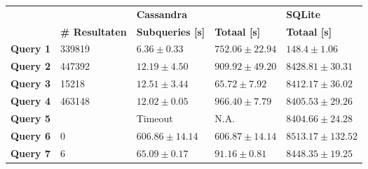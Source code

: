 \begin{table}[h]

\begin{tabular}{@{}lllll@{}}
\cmidrule(l){3-5}
                              &         & \multicolumn{2}{|l|}{\textbf{Cassandra}}                                                      & \multicolumn{1}{l|}{\textbf{SQLite}}                             \\ 
\cmidrule(l){2-5}
\multicolumn{1}{l|}{}  & \multicolumn{1}{l|}{\textbf{\# Resultaten}}               & \multicolumn{1}{l|}{\textbf{Subqueries [s]}} & \multicolumn{1}{l|}{\textbf{Totaal [s]}} & \multicolumn{1}{l|}{\textbf{Totaal [s]}} \\ \midrule
\multicolumn{1}{|l|}{\textbf{Query 1}} & \multicolumn{1}{l|}{339819} & \multicolumn{1}{l|}{$6.36 \pm 0.33$}             & \multicolumn{1}{l|}{$752.06 \pm 22.94$}          & \multicolumn{1}{l|}{$148.4 \pm 1.06$}                        \\
\multicolumn{1}{|l|}{\textbf{Query 2}} & \multicolumn{1}{l|}{447392} &\multicolumn{1}{l|}{$12.19 \pm 4.50$}            & \multicolumn{1}{l|}{$909.92 \pm 49.20$}          & \multicolumn{1}{l|}{$8428.81 \pm 30.31$}                        \\
\multicolumn{1}{|l|}{\textbf{Query 3}} & \multicolumn{1}{l|}{15218} &\multicolumn{1}{l|}{$12.51 \pm 3.44$}            & \multicolumn{1}{l|}{$65.72 \pm 7.92$}            & \multicolumn{1}{l|}{$8412.17 \pm 36.02$}                        \\
\multicolumn{1}{|l|}{\textbf{Query 4}} & \multicolumn{1}{l|}{463148} &\multicolumn{1}{l|}{$12.02 \pm 0.05$}            & \multicolumn{1}{l|}{$966.40 \pm 7.79$}           & \multicolumn{1}{l|}{$8405.53 \pm 29.26$}                        \\
\multicolumn{1}{|l|}{\textbf{Query 5}} & \multicolumn{1}{l|}{} &\multicolumn{1}{l|}{Timeout}                 & \multicolumn{1}{l|}{N.A.}                    & \multicolumn{1}{l|}{$8404.66 \pm 24.28$}                        \\
\multicolumn{1}{|l|}{\textbf{Query 6}} & \multicolumn{1}{l|}{0} &\multicolumn{1}{l|}{$606.86 \pm 14.14$}          & \multicolumn{1}{l|}{$606.87 \pm 14.14$}           & \multicolumn{1}{l|}{$8513.17 \pm 132.52$}                        \\
\multicolumn{1}{|l|}{\textbf{Query 7}} & \multicolumn{1}{l|}{6} &\multicolumn{1}{l|}{$65.09 \pm 0.17$} & \multicolumn{1}{l|}{$91.16 \pm 0.81$}       & \multicolumn{1}{l|}{$8448.35 \pm 19.25$}                                \\ 
\bottomrule
\end{tabular}
\end{table}

